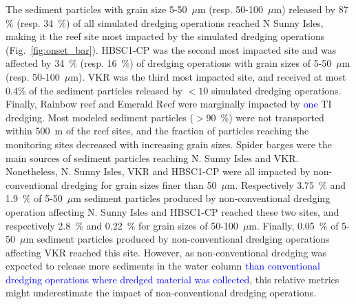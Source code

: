\documentclass[preprint,12pt,authoryear]{elsarticle}
\newcommand{\modif}[1]{\textcolor{blue}{#1}}
\begin{document}
The sediment particles with grain size 5-50~$\mu$m (resp. 50-100~$\mu$m) released by 87 \% (resp. 34~\%) of all simulated dredging operations reached N Sunny Isles, making it the reef site most impacted by the simulated dredging operations (Fig.~\ref{fig:onset_bar}). HBSC1-CP was the second most impacted site and was affected by 34~\% (resp. 16~\%) of dredging operations with grain sizes of 5-50~$\mu$m (resp. 50-100~$\mu$m). VKR was the third most impacted site, and received at most 0.4\% of the sediment particles released by $<10$ simulated dredging operations. Finally, Rainbow reef and Emerald Reef were marginally impacted by \modif{one} TI dredging. Most modeled sediment particles ($>90$~\%) were not transported within 500~m of the reef sites, and the fraction of particles reaching the monitoring sites decreased with increasing grain sizes. Spider barges were the main sources of sediment particles reaching N. Sunny Isles and VKR. Nonetheless, N. Sunny Isles, VKR and HBSC1-CP were all impacted by non-conventional dredging for grain sizes finer than 50~$\mu$m. Respectively 3.75~\% and 1.9~\% of 5-50~$\mu$m sediment particles produced by non-conventional dredging operation affecting N. Sunny Isles and HBSC1-CP reached these two sites, and respectively 2.8~\% and 0.22~\% for grain sizes of 50-100~$\mu$m. Finally, 0.05~\% of 5-50~$\mu$m sediment particles produced by non-conventional dredging operations affecting VKR reached this site. However, as non-conventional dredging was expected to release more sediments in the water column \modif{than conventional dredging operations where dredged material was collected}, this relative metrics might underestimate the impact of non-conventional dredging operations.
\end{document}
